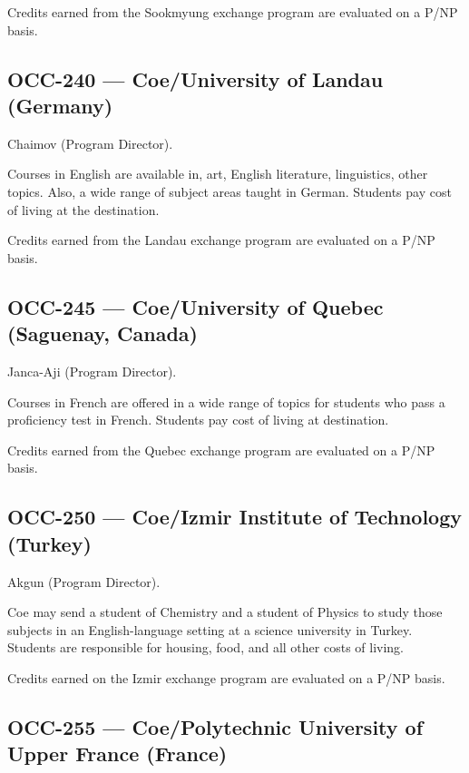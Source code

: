 \documentclass[
  letterpaper,
]{scrbook}
\begin{document}
Credits earned from the Sookmyung exchange program are evaluated on a
P/NP basis.

\subsection{OCC-240 --- Coe/University of Landau
(Germany)}\label{occ-240-coeuniversity-of-landau-germany}

Chaimov (Program Director).

Courses in English are available in, art, English literature,
linguistics, other topics. Also, a wide range of subject areas taught in
German. Students pay cost of living at the destination.

Credits earned from the Landau exchange program are evaluated on a P/NP
basis.

\subsection{OCC-245 --- Coe/University of Quebec (Saguenay,
Canada)}\label{occ-245-coeuniversity-of-quebec-saguenay-canada}

Janca-Aji (Program Director).

Courses in French are offered in a wide range of topics for students who
pass a proficiency test in French. Students pay cost of living at
destination.

Credits earned from the Quebec exchange program are evaluated on a P/NP
basis.

\subsection{OCC-250 --- Coe/Izmir Institute of Technology
(Turkey)}\label{occ-250-coeizmir-institute-of-technology-turkey}

Akgun (Program Director).

Coe may send a student of Chemistry and a student of Physics to study
those subjects in an English-language setting at a science university in
Turkey. Students are responsible for housing, food, and all other costs
of living.

Credits earned on the Izmir exchange program are evaluated on a P/NP
basis.

\subsection{OCC-255 --- Coe/Polytechnic University of Upper France
(France)}\label{occ-255-coepolytechnic-university-of-upper-france-france}
\end{document}
